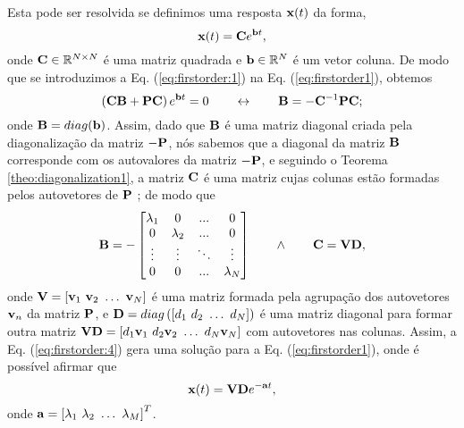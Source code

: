 \begin{myproofT}
Esta pode ser resolvida se definimos uma resposta $\VECTOR{X}(t)$ da forma, 
\begin{equation}\label{eq:firstorder:1}
\VECTOR{X}(t)=\MATRIX{C}e^{\VECTOR{b}t},
\end{equation}
onde $\MATRIX{C} \in \mathbb{R}^{N\times N}$ é uma matriz quadrada e $\VECTOR{b} \in \mathbb{R}^{N}$ é um vetor coluna.
De modo que se introduzimos a Eq. (\ref{eq:firstorder:1}) na Eq. (\ref{eq:firstorder1}),
obtemos 
\begin{equation}\label{eq:firstorder:2}
\left(\MATRIX{C}\MATRIX{B}+\MATRIX{P}\MATRIX{C}\right)e^{\VECTOR{b}t} = 0 
\qquad \leftrightarrow \qquad
\MATRIX{B}=-\MATRIX{C}^{-1}\MATRIX{P}\MATRIX{C};
\end{equation}
onde $\MATRIX{B}=\funcdiag(\VECTOR{b})$. 
Assim, dado que $\MATRIX{B}$ é uma matriz diagonal criada pela diagonalização da  
matriz $-\MATRIX{P}$, nós sabemos que
a diagonal da matriz $\MATRIX{B}$ corresponde com os autovalores da matriz $-\MATRIX{P}$,
e seguindo o Teorema \ref{theo:diagonalization1}, a matriz $\MATRIX{C}$ é uma matriz cujas colunas estão formadas pelos 
autovetores de $\MATRIX{P}$ \cite[pp. 67]{golub2013matrix}; de modo que
\begin{equation}\label{eq:firstorder:4}
\MATRIX{B}=-
\begin{bmatrix}
\lambda_1 & 0         & ...    & 0 \\
0         & \lambda_2 & ...    & 0 \\
\vdots    & \vdots    & \ddots & \vdots \\
0         & 0         & ...    & \lambda_N
\end{bmatrix}
\qquad \wedge \qquad 
\MATRIX{C}=\MATRIX{V}\MATRIX{D}, 
\end{equation}
onde $\MATRIX{V}=\left[ \VECTOR{v}_1~  \VECTOR{v}_2~  \dots~ \VECTOR{v}_N\right]$ 
é uma matriz formada pela agrupação dos autovetores $\VECTOR{v}_n$ da matriz $\MATRIX{P}$,
e $\MATRIX{D}=\funcdiag\left(\left[ d_1~  d_2~  \dots~ d_N\right]\right)$ 
é uma matriz diagonal para formar outra matriz  
$\MATRIX{V}\MATRIX{D}=\left[ d_1\VECTOR{v}_1~  d_2\VECTOR{v}_2~  \dots~ d_N\VECTOR{v}_N\right]$
com autovetores nas colunas.
Assim, a Eq. (\ref{eq:firstorder:4}) gera uma solução para a Eq. (\ref{eq:firstorder1}),
onde é possível afirmar que
\begin{equation}\label{eq:firstorder:5}
\VECTOR{X}(t)=\MATRIX{V}\MATRIX{D} e^{-\VECTOR{a} t},
\end{equation}
onde $\VECTOR{a}=\left[ \lambda_1~ \lambda_2~ \dots~ \lambda_M\right]^{T}$.
\end{myproofT}

